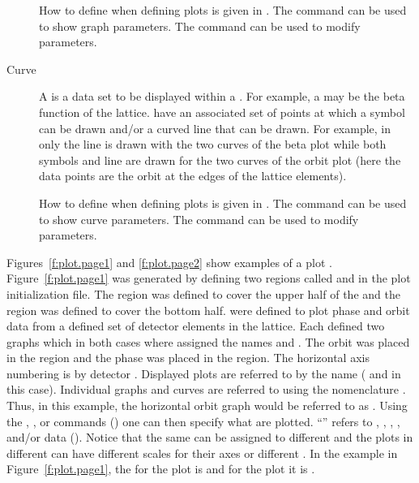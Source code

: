 \begin{description}
How to define  when defining  plots is given in . The
 command can be used to show graph parameters. The  command can
be used to modify  parameters.
%
\item[Curve] \Newline
A  is a data set to be displayed within a . For example, a  may be the
beta function of the  lattice.  have an associated set of points at which a
symbol can be drawn and/or a curved line that can be drawn. For example, in  only
the line is drawn with the two curves of the beta plot while both symbols and line are drawn for the
two curves of the orbit plot (here the data points are the orbit at the edges of the lattice elements).

How to define  when defining  plots is given in . The
 command can be used to show curve parameters. The  command can
be used to modify  parameters.
%
\end{description}


Figures~\ref{f:plot.page1} and \ref{f:plot.page2} show examples of a plot
. Figure~\ref{f:plot.page1} was generated by defining two regions called 
and  in the plot initialization file. The  region was defined to cover
the upper half of the  and the  region was defined to cover the bottom
half.  were defined to plot phase and orbit data from a defined set of
detector elements in the lattice. Each  defined two graphs which in both
cases where assigned the names  and . The orbit  was placed
in the  region and the phase  was placed in the 
region. The horizontal axis numbering is by detector .  Displayed plots are
referred to by the  name ( and  in this case). Individual
graphs and curves are referred to using the nomenclature . Thus, in
this example, the horizontal orbit graph would be referred to as .  Using the
, , or  commands () one can then
specify what  are plotted. ``'' refers to ,
, , , and/or  data ().
Notice that the same  can be assigned to different  and the
plots in different  can have different scales for their axes or different
. In the example in Figure~\ref{f:plot.page1}, the  for the
 plot is  and for the  plot it is .

